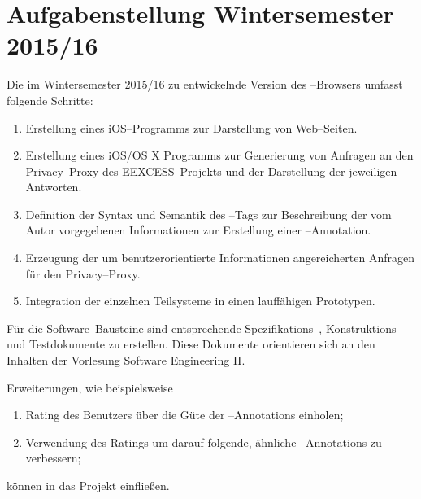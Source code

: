 \section{Aufgabenstellung Wintersemester 2015/16}
Die im Wintersemester 2015/16 zu entwickelnde Version des
\SECH--Browsers umfasst folgende Schritte:
\begin{enumerate}
     \item Erstellung eines iOS--Programms zur Darstellung von
    Web--Seiten.
     \item Erstellung eines iOS/OS X Programms zur Generierung von
    Anfragen an den Privacy--Proxy des EEXCESS--Projekts und der
    Darstellung der jeweiligen Antworten.
     \item Definition der Syntax und Semantik des \SEARCH--Tags
    zur Beschreibung der vom Autor vorgegebenen Informationen zur
    Erstellung einer \SECH--Annotation.
     \item Erzeugung der um benutzerorientierte Informationen
    angereicherten Anfragen für den Privacy--Proxy.
     \item Integration der einzelnen Teilsysteme in einen lauffähigen
    Prototypen. 
\end{enumerate}
Für die Software--Bausteine sind entsprechende Spezifikations--,
Konstruktions-- und Testdokumente zu erstellen. Diese Dokumente
orientieren sich an den Inhalten der Vorlesung \glqq Software
Engineering II\grqq.
 
Erweiterungen, wie beispielsweise
\begin{enumerate}
     \item Rating des Benutzers über die Güte der \SECH--Annotations einholen;
     \item Verwendung des Ratings um darauf folgende, ähnliche
    \SECH--Annotations zu verbessern;
\end{enumerate}
können in das Projekt einfließen.